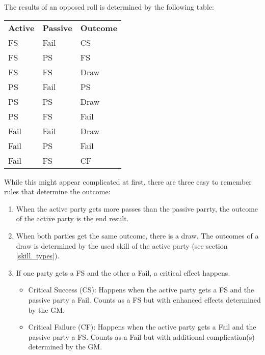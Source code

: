 The results of an opposed roll is determined by the following table:
\begin{tabular}{l | l | l}
	\textbf{Active} &  \textbf{Passive} & \textbf{Outcome} \\
	FS & Fail & CS\\
	FS & PS & FS \\
	FS & FS & Draw \\
	PS & Fail & PS \\
	PS & PS & Draw \\
	PS & FS & Fail \\
	Fail & Fail & Draw\\
	Fail & PS & Fail \\
	Fail & FS & CF\\
\end{tabular}

While this might appear complicated at first, there are three easy to remember rules that determine the outcome:
\begin{enumerate}
	\item When the active party gets more passes than the passive parrty, the outcome of the active party is the end result.
	\item When both parties get the same outcome, there is a draw. The outcomes of a draw is determined by the used skill of the active party (see section \ref{skill_types}).
	\item If one party gets a FS and the other a Fail, a critical effect happens. 
	\begin{itemize}
		\item Critical Success (CS): Happens when the active party gets a FS and the passive party a Fail. Counts as a FS but with enhanced effects determined by the GM.
		\item Critical Failure (CF): Happens when the active party gets a Fail and the passive party a FS. Counts as a Fail but with additional complication(s) determined by the GM.
	\end{itemize}

\end{enumerate}



